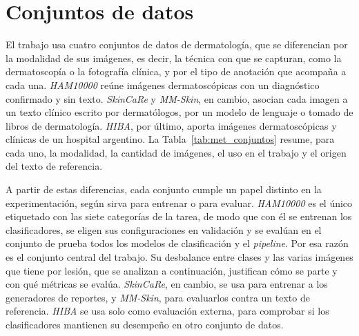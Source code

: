 \section{Conjuntos de datos}
\label{sec:met_datasets}

El trabajo usa cuatro conjuntos de datos de dermatología, que se diferencian por la modalidad de sus imágenes, es
decir, la técnica con que se capturan, como la dermatoscopía o la fotografía clínica, y por el tipo de anotación que
acompaña a cada una. \emph{HAM10000} reúne imágenes dermatoscópicas con un diagnóstico
confirmado y sin texto. \emph{SkinCaRe} y \emph{MM-Skin}, en cambio, asocian cada imagen a un texto clínico escrito
por dermatólogos, por un modelo de lenguaje o tomado de libros de dermatología. \emph{HIBA}, por último, aporta imágenes dermatoscópicas y clínicas de un hospital argentino. La
Tabla~\ref{tab:met_conjuntos} resume, para cada uno, la modalidad, la cantidad de imágenes, el uso en el trabajo y el
origen del texto de referencia.

A partir de estas diferencias, cada conjunto cumple un papel distinto en la experimentación, según sirva para entrenar
o para evaluar. \emph{HAM10000} es el único etiquetado con las siete categorías de la tarea, de modo que con él se entrenan
los clasificadores, se eligen sus configuraciones en validación y se evalúan en el conjunto de prueba todos los modelos de
clasificación y el \emph{pipeline}. Por esa razón es el conjunto central del trabajo. Su desbalance entre clases y las varias imágenes que tiene por lesión, que se analizan a continuación, justifican cómo se parte y con qué métricas se evalúa. \emph{SkinCaRe}, en cambio, se usa
para entrenar a los generadores de reportes, y \emph{MM-Skin}, para evaluarlos contra un texto de referencia.
\emph{HIBA} se usa solo como evaluación externa, para comprobar si los clasificadores mantienen su desempeño en otro
conjunto de datos.

